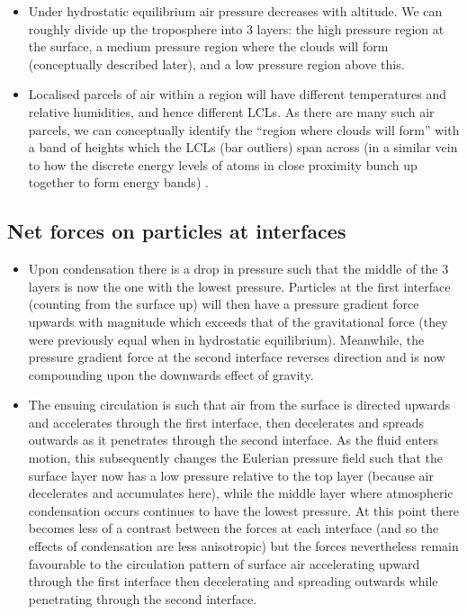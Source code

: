 \begin{itemize}
	\item Under hydrostatic equilibrium air pressure decreases with altitude. We can roughly divide up the troposphere into 3 layers: the high pressure region at the surface, a medium pressure region where the clouds will form (conceptually described later), and a low pressure region above this. 
	\item Localised parcels of air within a region will have different temperatures and relative humidities, and hence different \acp{LCL}. As there are many such air parcels, we can conceptually identify the “region where clouds will form” with a band of heights which the \acp{LCL} (bar outliers) span across (in a similar vein to how the discrete energy levels of atoms in close proximity bunch up together to form energy bands) \citep{green1998}.
\end{itemize}

\subsection{Net forces on particles at interfaces}

\begin{itemize}
	\item Upon condensation there is a drop in pressure such that the middle of the 3 layers is now the one with the lowest pressure. Particles at the first interface (counting from the surface up) will then have a pressure gradient force upwards with magnitude which exceeds that of the gravitational force (they were previously equal when in hydrostatic equilibrium). Meanwhile, the pressure gradient force at the second interface reverses direction and is now compounding upon the downwards effect of gravity. 
	\item The ensuing circulation is such that air from the surface is directed upwards and accelerates through the first interface, then decelerates and spreads outwards as it penetrates through the second interface. As the fluid enters motion, this subsequently changes the Eulerian pressure field such that the surface layer now has a low pressure relative to the top layer (because air decelerates and accumulates here), while the middle layer where atmospheric condensation occurs continues to have the lowest pressure. At this point there becomes less of a contrast between the forces at each interface (and so the effects of condensation are less anisotropic) but the forces nevertheless remain favourable to the circulation pattern of surface air accelerating upward through the first interface then decelerating and spreading outwards while penetrating through the second interface.
\end{itemize}

